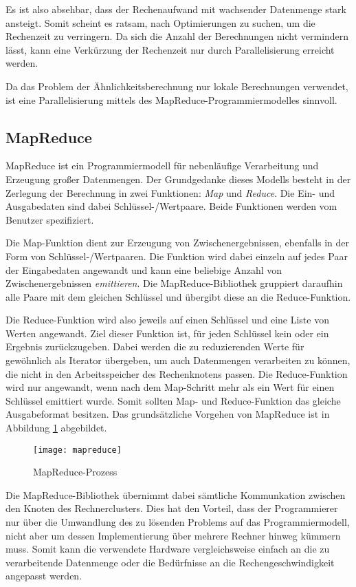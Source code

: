 Es ist also absehbar, dass der Rechenaufwand mit wachsender Datenmenge stark ansteigt. Somit scheint es ratsam, nach Optimierungen zu suchen, um die Rechenzeit zu verringern. Da sich die Anzahl der Berechnungen nicht vermindern lässt, kann eine Verkürzung der Rechenzeit nur durch Parallelisierung erreicht werden.

Da das Problem der Ähnlichkeitsberechnung nur lokale Berechnungen verwendet, ist eine Parallelisierung mittels des MapReduce-Programmiermodelles sinnvoll.

\subsection{MapReduce}
\label{mapreduce}

MapReduce \cite{dg2004} ist ein Programmiermodell für nebenläufige Verarbeitung und Erzeugung großer Datenmengen. Der Grundgedanke dieses Modells besteht in der Zerlegung der Berechnung in zwei Funktionen: \emph{Map} und \emph{Reduce}. Die Ein- und Ausgabedaten sind dabei Schlüssel-/Wertpaare. Beide Funktionen werden vom Benutzer spezifiziert.

Die Map-Funktion dient zur Erzeugung von Zwischenergebnissen, ebenfalls in der Form von Schlüssel-/Wertpaaren. Die Funktion wird dabei einzeln auf jedes Paar der Eingabedaten angewandt und kann eine beliebige Anzahl von Zwischenergebnissen \emph{emittieren}. Die MapReduce-Bibliothek gruppiert daraufhin alle Paare mit dem gleichen Schlüssel und übergibt diese an die Reduce-Funktion.

Die Reduce-Funktion wird also jeweils auf einen Schlüssel und eine Liste von Werten angewandt. Ziel dieser Funktion ist, für jeden Schlüssel kein oder ein Ergebnis zurückzugeben. Dabei werden die zu reduzierenden Werte für gewöhnlich als Iterator übergeben, um auch Datenmengen verarbeiten zu können, die nicht in den Arbeitsspeicher des Rechenknotens passen. Die Reduce-Funktion wird nur angewandt, wenn nach dem Map-Schritt mehr als ein Wert für einen Schlüssel emittiert wurde. Somit sollten Map- und Reduce-Funktion das gleiche Ausgabeformat besitzen. Das grundsätzliche Vorgehen von MapReduce ist in Abbildung \ref{fig:mapreduce} abgebildet.

\begin{figure}
\centering
\texttt{[image: mapreduce]}
\caption{MapReduce-Prozess}
\label{fig:mapreduce}
\end{figure}

Die MapReduce-Bibliothek übernimmt dabei sämtliche Kommunkation zwischen den Knoten des Rechnerclusters. Dies hat den Vorteil, dass der Programmierer nur über die Umwandlung des zu lösenden Problems auf das Programmiermodell, nicht aber um dessen Implementierung über mehrere Rechner hinweg kümmern muss. Somit kann die verwendete Hardware vergleichsweise einfach an die zu verarbeitende Datenmenge oder die Bedürfnisse an die Rechengeschwindigkeit angepasst werden.

